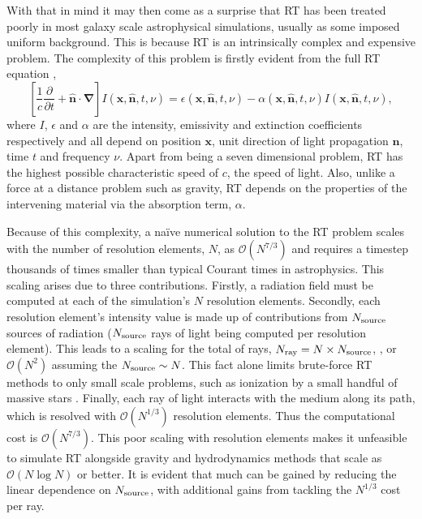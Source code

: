 \documentclass[fleq,usenatbib]{mnras}
\newcommand{\bigO}[1]{\mathcal{O}\left(#1\right)}
\newcommand{\NS}{N_{\rm source}}
\newcommand{\NR}{N_{\rm ray}}
\begin{document}
With that in mind it may then come as a surprise that RT has been treated 
poorly in most galaxy scale astrophysical simulations, usually as some 
imposed uniform background. This is because 
RT is an intrinsically complex and expensive problem. 
The complexity of this problem is firstly evident from the full RT equation 
\citep[e.g.][]{mihalasMihalas84},
\begin{equation} \label{eqn:classicrt}
\left[ \frac{1}{c} \frac{\partial}{\partial t} + \mathbf{\hat{n} \cdot \nabla}
 \right] I\left(\mathbf{x}, \mathbf{\hat{n}}, t, \nu\right) = 
\epsilon\left(\mathbf{x}, \mathbf{\hat{n}}, t, \nu\right) - 
\alpha\left(\mathbf{x}, \mathbf{\hat{n}}, t, \nu\right) 
I\left(\mathbf{x}, \mathbf{\hat{n}}, t, \nu\right),
\end{equation} 
where $I$, $\epsilon$ and $\alpha$ are the intensity, emissivity and 
extinction coefficients respectively and all depend on position $\mathbf{x}$, 
unit direction of light propagation $\mathbf{\hat{n}}$, time $t$ and frequency 
$\nu$. Apart from being a seven dimensional problem, RT has the highest 
possible characteristic speed of $c$, the speed of light. Also, unlike a force 
at a distance problem such as gravity, RT depends on the properties of the 
intervening material via the absorption term, $\alpha$.

Because of this complexity, a na\"ive numerical solution to the RT problem 
scales with the number of resolution elements, $N$, as $\bigO{N^{7/3}}$ and 
requires a timestep thousands of times smaller than typical Courant times in 
astrophysics. This scaling arises due to three contributions. 
Firstly, a radiation field must be computed at each of the simulation's $N$ resolution elements.
Secondly, each resolution element's intensity value is made up of 
contributions from $\NS$ sources of radiation 
($\NS$ rays of light being computed per resolution element). This leads to a 
scaling for the total of rays, $\NR = N \times \NS$,
, or $\bigO{N^2}$ assuming the $\NS \sim N$. This 
fact alone limits brute-force RT methods to only small scale problems, such as 
ionization by a small handful of massive stars \citep{howard16, howard17}.
Finally, each ray of light interacts with the 
medium along its path, which is resolved with $\bigO{N^{1/3}}$ 
resolution elements.
Thus the computational cost is $\bigO{N^{7/3}}$. 
This poor scaling with resolution elements makes it unfeasible to simulate RT 
alongside gravity and hydrodynamics methods that scale as $\bigO{N\log N}$ or better.
It is evident that much can be gained by reducing the linear dependence on 
$\NS$, with additional gains from tackling the $N^{1/3}$ cost per ray.
\end{document}
